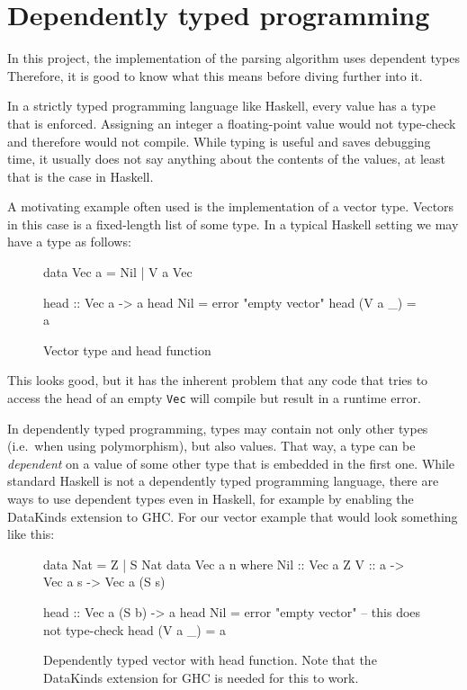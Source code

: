 \documentclass[a4paper,12pt,notitlepage]{report}
\begin{document}
\section{Dependently typed programming}
In this project, the implementation of the parsing algorithm uses dependent
types Therefore, it is good to know what this means before diving further into
it.

In a strictly typed programming language like Haskell, every value has a type
that is enforced. Assigning an integer a floating-point value would not
type-check and therefore would not compile. While typing is useful and saves
debugging time, it usually does not say anything about the contents of the
values, at least that is the case in Haskell.

A motivating example often used is the implementation of a vector type. Vectors
in this case is a fixed-length list of some type. In a typical Haskell setting
we may have a type as follows:

\begin{figure}[H]
\begin{code}
data Vec a = Nil | V a Vec

head :: Vec a -> a
head Nil = error "empty vector"
head (V a _) = a
\end{code}
\caption{\small Vector type and head function}
\end{figure}

This looks good, but it has the inherent problem that any code that tries to
access the head of an empty \texttt{Vec} will compile but result in a runtime error. 

In dependently typed programming, types may contain not only other types (i.e.\
when using polymorphism), but also values. That way, a type can be
\textit{dependent} on a value of some other type that is embedded in the first
one. While standard Haskell is not a dependently typed programming language,
there are ways to use dependent types even in Haskell, for example by enabling
the DataKinds extension to GHC. For our vector example that would look something
like this:

\begin{figure}[H]
\begin{code}
data Nat = Z | S Nat
data Vec a n where
    Nil :: Vec a Z
    V :: a -> Vec a s -> Vec a (S s)

head :: Vec a (S b) -> a
head Nil = error "empty vector" -- this does not type-check
head (V a _) = a
\end{code}
\caption{\small Dependently typed vector with head function. Note that the DataKinds
extension for GHC is needed for this to work.}
\end{figure}
\end{document}

